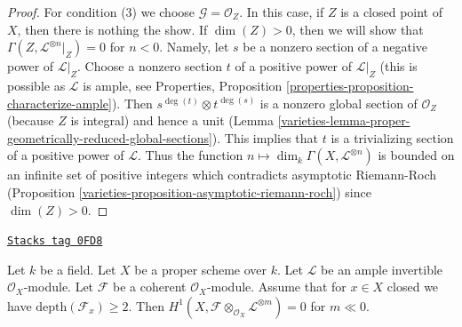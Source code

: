 \begin{proof}
\medskip\noindent
For condition (3) we choose $\mathcal{G} = \mathcal{O}_Z$.
In this case, if $Z$ is a closed point of $X$, then there is
nothing the show. If $\dim(Z) > 0$, then we will show that
$\Gamma(Z, \mathcal{L}^{\otimes n}|_Z) = 0$
for $n < 0$. Namely, let $s$ be a nonzero section of a negative
power of $\mathcal{L}|_Z$. Choose a nonzero section $t$ of a positive
power of $\mathcal{L}|_Z$ (this is possible as $\mathcal{L}$ is ample, see
Properties, Proposition \ref{properties-proposition-characterize-ample}).
Then $s^{\deg(t)} \otimes t^{\deg(s)}$
is a nonzero global section of $\mathcal{O}_Z$
(because $Z$ is integral) and hence
a unit (Lemma \ref{varieties-lemma-proper-geometrically-reduced-global-sections}).
This implies that $t$ is a trivializing section
of a positive power of $\mathcal{L}$.
Thus the function $n \mapsto \dim_k \Gamma(X, \mathcal{L}^{\otimes n})$
is bounded on an infinite set of positive integers which contradicts
asymptotic Riemann-Roch
(Proposition \ref{varieties-proposition-asymptotic-riemann-roch})
since $\dim(Z) > 0$.
\end{proof}

\begin{lemma}

\label{varieties-lemma-vanishin-h1-negative}
\href{https://stacks.math.columbia.edu/tag/0FD8}{\texttt{Stacks tag 0FD8}}

Let $k$ be a field. Let $X$ be a proper scheme over $k$. Let $\mathcal{L}$
be an ample invertible $\mathcal{O}_X$-module. Let $\mathcal{F}$ be a
coherent $\mathcal{O}_X$-module. Assume that
for $x \in X$ closed we have $\text{depth}(\mathcal{F}_x) \geq 2$.
Then
$H^1(X, \mathcal{F} \otimes_{\mathcal{O}_X} \mathcal{L}^{\otimes m}) = 0$
for $m \ll 0$.
\end{lemma}


